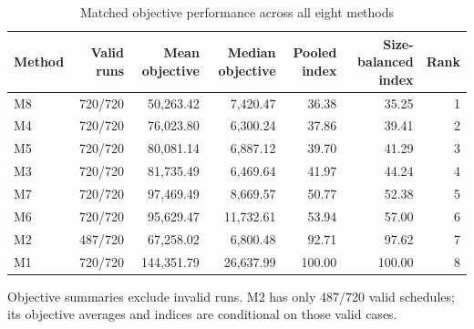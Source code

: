 \begin{table}[htbp]
\centering
\caption{Matched objective performance across all eight methods}
\label{tab:all_methods_objective}
\small
\begin{tabular}{lrrrrrr}
\toprule
Method & Valid runs & Mean objective & Median objective & Pooled index & Size-balanced index & Rank \\
\midrule
M8 & 720/720 & 50,263.42 & 7,420.47 & 36.38 & 35.25 & 1 \\
M4 & 720/720 & 76,023.80 & 6,300.24 & 37.86 & 39.41 & 2 \\
M5 & 720/720 & 80,081.14 & 6,887.12 & 39.70 & 41.29 & 3 \\
M3 & 720/720 & 81,735.49 & 6,469.64 & 41.97 & 44.24 & 4 \\
M7 & 720/720 & 97,469.49 & 8,669.57 & 50.77 & 52.38 & 5 \\
M6 & 720/720 & 95,629.47 & 11,732.61 & 53.94 & 57.00 & 6 \\
M2 & 487/720 & 67,258.02 & 6,800.48 & 92.71 & 97.62 & 7 \\
M1 & 720/720 & 144,351.79 & 26,637.99 & 100.00 & 100.00 & 8 \\
\bottomrule
\end{tabular}
\begin{minipage}{\textwidth}\footnotesize Objective summaries exclude invalid runs. M2 has only 487/720 valid schedules; its objective averages and indices are conditional on those valid cases.\end{minipage}
\end{table}
